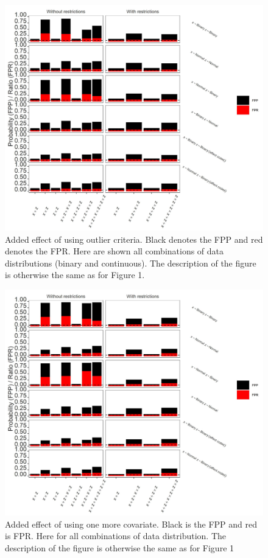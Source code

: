 \begin{figure}[ht]
\includegraphics{R/Analysis/Result/Figures/Figure1BSI.jpeg}
\centering
\caption{Added effect of using outlier criteria. Black denotes the FPP and red denotes the FPR. Here are shown  all combinations of data distributions (binary and continuous). The description of the figure is otherwise the same as for Figure 1.}
\label{fig:mainfigure}
\end{figure}

\begin{figure}[ht]
\includegraphics{R/Analysis/Result/Figures/Figure1CSI.jpeg}
\centering
\caption{Added effect of using one more covariate. Black is the FPP and red is FPR.  Here for all combinations of data distribution. The description of the figure is otherwise the same as for Figure 1}
\label{fig:mainfigure}
\end{figure}


